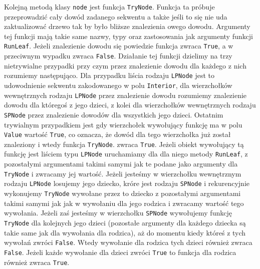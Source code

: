 \documentclass{article}
\begin{document}
Kolejną metodą klasy \texttt{node} jest funkcja \texttt{TryNode}. Funkcja ta próbuje przeprowadzić cały dowód zadanego sekwentu a także jeśli to się nie uda zaktualizować drzewo tak by było bliższe znalezienia owego dowodu. Argumenty tej funkcji mają takie same nazwy, typy oraz zastosowania jak argumenty funkcji \texttt{RunLeaf}. Jeżeli znalezienie dowodu się powiedzie funkcja zwraca \texttt{True}, a w przeciwnym wypadku zwraca \texttt{False}. Działanie tej funkcji dzielimy na trzy nietrywialne przypadki przy czym przez znalezienie dowodu dla każdego z nich rozumiemy następująco. Dla przypadku liścia rodzaju \texttt{LPNode} jest to udowodnienie sekwentu zakodowanego w polu \texttt{Interior}, dla wierzchołków wewnętrznych rodzaju \texttt{LPNode} przez znalezienie dowodu rozumiemy znalezienie dowodu dla któregoś z jego dzieci, z kolei dla wierzchołków wewnętrznych rodzaju \texttt{SPNode} przez znalezienie dowodów dla wszystkich jego dzieci. Ostatnim trywialnym przypadkiem jest gdy wierzchołek wywołujący funkcję ma w polu \texttt{Value} wartość \texttt{True}, co oznacza, że dowód dla tego wierzchołka już został znaleziony i wtedy funkcja \texttt{TryNode}. zwraca \texttt{True}. Jeżeli obiekt wywołujący tą funkcję jest liściem typu \texttt{LPNode} uruchamiamy dla dla niego metody \texttt{RunLeaf}, z pozostałymi argumentami takimi samymi jak te podane jako argumenty dla \texttt{TryNode} i zwracamy jej wartość. Jeżeli jesteśmy w wierzchołku wewnętrznym rodzaju \texttt{LPNode} losujemy jego dziecko, króre jest rodzaju \texttt{SPNode} i  rekurencyjnie wykonujemy \texttt{TryNode} wywołane przez to dziecko z pozostałymi argumentami takimi samymi jak jak w wywołaniu dla jego rodzica i zwracamy wartość tego wywołania. Jeżeli zaś jesteśmy w wierzchołku \texttt{SPNode} wywołujemy funkcję \texttt{TryNode} dla kolejnych jego dzieci (pozostałe argumenty dla każdego dziecka są takie same jak dla wywołania dla rodzica), aż do momentu kiedy któreś z tych wywołań zwróci \texttt{False}. Wtedy wywołanie dla rodzica tych dzieci również zwraca \texttt{False}. Jeżeli każde wywołanie dla dzieci zwróci \texttt{True} to funkcja dla rodzica również zwraca \texttt{True}.


\end{document}
